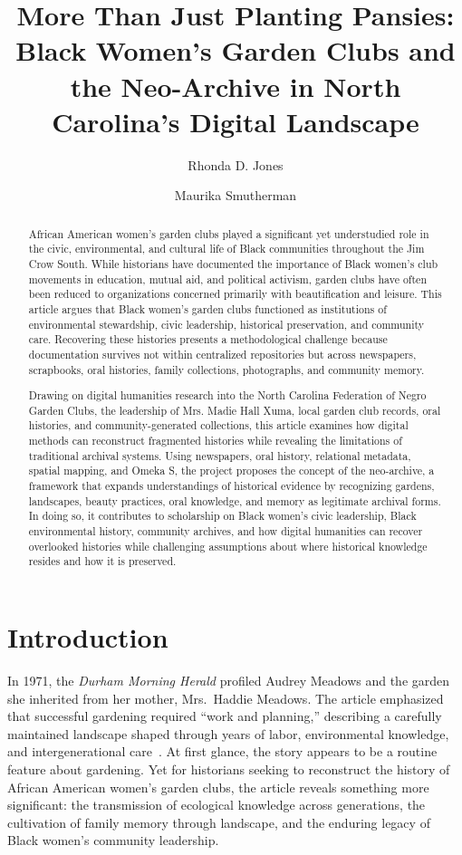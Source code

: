 \documentclass[final]{anthology-ch}
\title{More Than Just Planting Pansies: Black Women's Garden Clubs and the Neo-Archive in North Carolina's Digital Landscape}
\author[1]{Rhonda D. Jones}[
  orcid=
]
\author[2]{Maurika Smutherman}[
  orcid=
]
\affiliation{1}{University of North Carolina at Greensboro, Greensboro, NC, USA}
\affiliation{2}{North Carolina Central University, Durham, NC, USA}
\begin{document}
\maketitle

\begin{abstract}
African American women's garden clubs played a significant yet understudied role in the civic, environmental, and cultural life of Black communities throughout the Jim Crow South. While historians have documented the importance of Black women's club movements in education, mutual aid, and political activism, garden clubs have often been reduced to organizations concerned primarily with beautification and leisure. This article argues that Black women's garden clubs functioned as institutions of environmental stewardship, civic leadership, historical preservation, and community care. Recovering these histories presents a methodological challenge because documentation survives not within centralized repositories but across newspapers, scrapbooks, oral histories, family collections, photographs, and community memory.

Drawing on digital humanities research into the North Carolina Federation of Negro Garden Clubs, the leadership of Mrs. Madie Hall Xuma, local garden club records, oral histories, and community-generated collections, this article examines how digital methods can reconstruct fragmented histories while revealing the limitations of traditional archival systems. Using newspapers, oral history, relational metadata, spatial mapping, and Omeka S, the project proposes the concept of the neo-archive, a framework that expands understandings of historical evidence by recognizing gardens, landscapes, beauty practices, oral knowledge, and memory as legitimate archival forms. In doing so, it contributes to scholarship on Black women's civic leadership, Black environmental history, community archives, and how digital humanities can recover overlooked histories while challenging assumptions about where historical knowledge resides and how it is preserved.
\end{abstract}

\section{Introduction} \label{sec:intro}

In 1971, the \textit{Durham Morning Herald} profiled Audrey Meadows and the garden she inherited from her mother, Mrs.\ Haddie Meadows. The article emphasized that successful gardening required \enquote{work and planning,} describing a carefully maintained landscape shaped through years of labor, environmental knowledge, and intergenerational care~\cite{hodges1971green}. At first glance, the story appears to be a routine feature about gardening. Yet for historians seeking to reconstruct the history of African American women's garden clubs, the article reveals something more significant: the transmission of ecological knowledge across generations, the cultivation of family memory through landscape, and the enduring legacy of Black women's community leadership.
\end{document}
